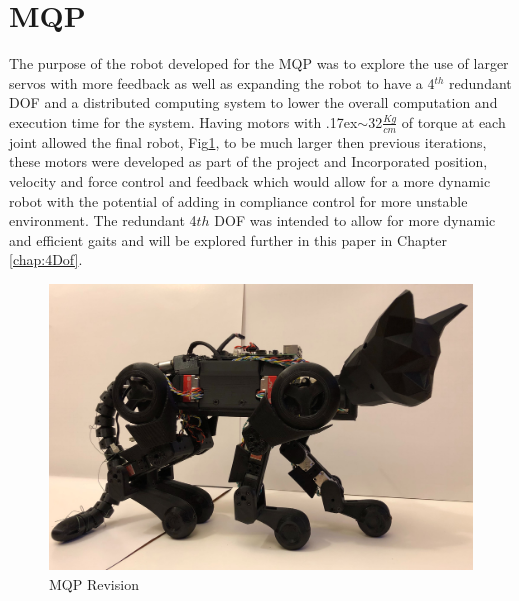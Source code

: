 \documentclass[12pt]{report}
\newcommand{\approximately}{{\raise.17ex\hbox{$\scriptstyle\mathtt{\sim}$}}}
\begin{document}
\section{MQP}
The purpose of the robot developed for the MQP was to explore the use of larger servos with more feedback as well as expanding the robot to have a 4$^{th}$ redundant DOF and a distributed computing system to lower the overall computation and execution time for the system. Having motors with \approximately32$\frac{Kg}{cm}$ of torque at each joint allowed the final robot, Fig\ref{fig:MQPKat}, to be much larger then previous iterations, these motors were developed as part of the project and Incorporated position, velocity and force control and feedback which would allow for a more dynamic robot with the potential of adding in compliance control for more unstable environment. The redundant 4${th}$ DOF was intended to allow for more dynamic and efficient gaits and will be explored further in this paper in Chapter \ref{chap:4Dof}. 
\begin{figure}[H]
    \centering
    \includegraphics[width=0.5\textheight]{Images/FinalRobot.jpg}
    \caption{MQP Revision}
    \label{fig:MQPKat}
\end{figure} 
\end{document}
